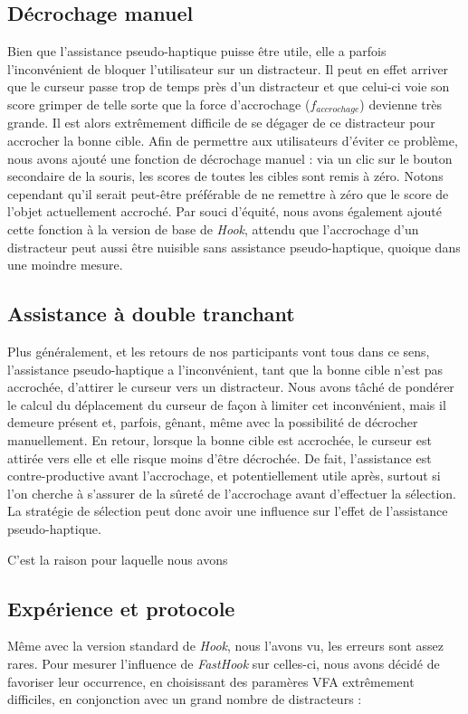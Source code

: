 	\subsection{Décrochage manuel}
	Bien que l'assistance pseudo-haptique puisse être utile, elle a parfois l'inconvénient de \og bloquer \fg{} l'utilisateur sur un distracteur. Il peut en effet arriver que le curseur passe trop de temps près d'un distracteur et que celui-ci voie son score grimper de telle sorte que la force d'accrochage ($f_{accrochage}$) devienne très grande. Il est alors extrêmement difficile de se dégager de ce distracteur pour accrocher la bonne cible. Afin de permettre aux utilisateurs d'éviter ce problème, nous avons ajouté une fonction de \og décrochage \fg{} manuel : via un clic sur le bouton secondaire de la souris, les scores de toutes les cibles sont remis à zéro. Notons cependant qu'il serait peut-être préférable de ne remettre à zéro que le score de l'objet actuellement accroché. Par souci d'équité, nous avons également ajouté cette fonction à la version de base de \emph{Hook}, attendu que l'accrochage d'un distracteur peut aussi être nuisible sans assistance pseudo-haptique, quoique dans une moindre mesure.
	
	\subsection{Assistance à double tranchant}
	Plus généralement, et les retours de nos participants vont tous dans ce sens, l'assistance pseudo-haptique a l'inconvénient, tant que la bonne cible n'est pas accrochée, d'attirer le curseur vers un distracteur. Nous avons tâché de pondérer le calcul du déplacement du curseur de façon à limiter cet inconvénient, mais il demeure présent et, parfois, gênant, même avec la possibilité de décrocher manuellement. En retour, lorsque la bonne cible est accrochée, le curseur est attirée vers elle et elle risque moins d'être décrochée. De fait, l'assistance est contre-productive avant l'accrochage, et potentiellement utile après, surtout si l'on cherche à s'assurer de la sûreté de l'accrochage avant d'effectuer la sélection. La stratégie de sélection peut donc avoir une influence sur l'effet de l'assistance pseudo-haptique.
	
	C'est la raison pour laquelle nous avons 

	
	\subsection{Expérience et protocole}
	Même avec la version standard de \emph{Hook}, nous l'avons vu, les erreurs sont assez rares. Pour mesurer l'influence de \emph{FastHook} sur celles-ci, nous avons décidé de favoriser leur occurrence, en choisissant des paramères VFA extrêmement difficiles, en conjonction avec un grand nombre de distracteurs :
	
